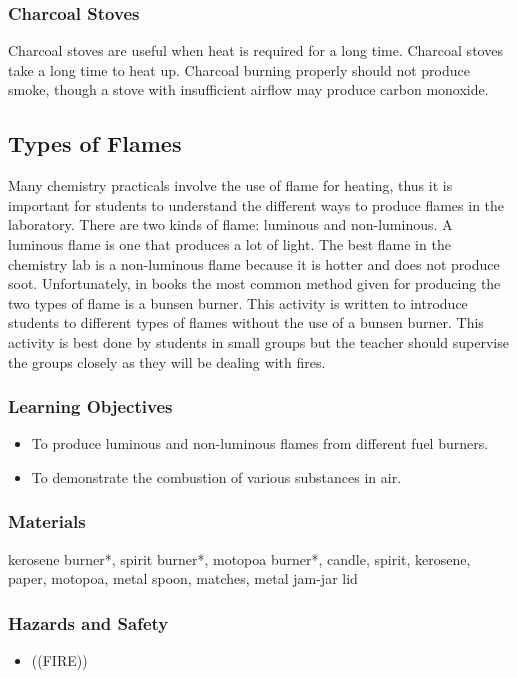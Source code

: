 \subsubsection{Charcoal Stoves}

Charcoal stoves are useful when heat is required for a long time. Charcoal stoves take a long time to heat up. Charcoal burning properly should not produce smoke, though a stove with insufficient airflow may produce carbon monoxide.

\subsection{Types of Flames}
Many chemistry practicals involve the use of flame for heating, thus it is important for students to understand the different ways to produce flames in the laboratory. There are two kinds of flame: luminous and non-luminous. A luminous flame is one that produces a lot of light. The best flame in the chemistry lab is a non-luminous flame because it is hotter and does not produce soot. Unfortunately, in books the most common method given for producing the two types of flame is a bunsen burner. This activity is written to introduce students to different types of flames without the use of a bunsen burner. This activity is best done by students in small groups but the teacher should supervise the groups closely as they will be dealing with fires.
\subsubsection*{Learning Objectives}
\begin{itemize}
\item{To produce luminous and non-luminous flames from different fuel burners.}
\item{To demonstrate the combustion of various substances in air.}
\end{itemize}

\subsubsection*{Materials}
kerosene burner*, spirit burner*, motopoa burner*, candle, spirit, kerosene, paper, motopoa, metal spoon, matches, metal jam-jar lid

\subsubsection*{Hazards and Safety}
\begin{itemize}
\item{((FIRE))}
\end{itemize}

